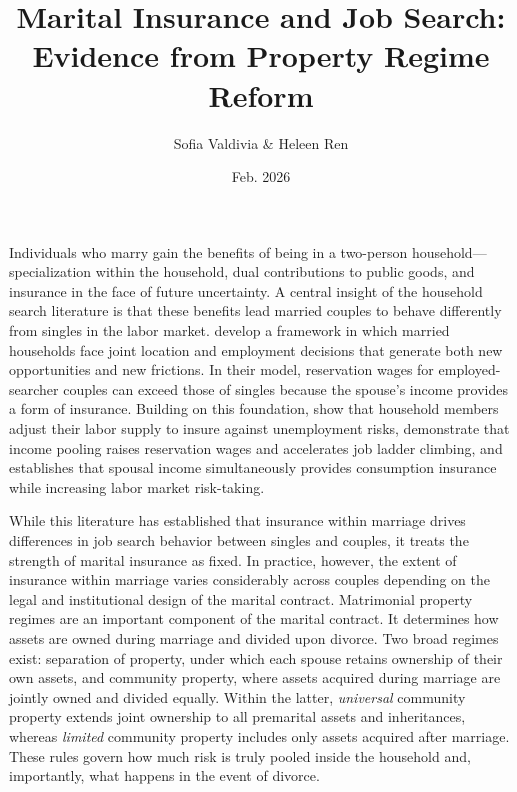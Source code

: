 \documentclass[11pt]{article}
\title{Marital Insurance and Job Search: Evidence from Property Regime Reform}
\author{Sofia Valdivia \& Heleen Ren}
\date{Feb. 2026}
\begin{document}
\maketitle

Individuals who marry gain the benefits of being in a two-person household—specialization within the household, dual contributions to public goods, and insurance in the face of future uncertainty. A central insight of the
household search literature is that these benefits lead married couples to behave differently from singles in the labor market. \cite{GULER2012352} develop a framework in which married households face joint location and employment decisions that generate both new opportunities and new frictions. In their model, reservation wages for employed-searcher couples can exceed those of singles because the spouse’s income provides a form of insurance. Building on this foundation, \cite{mankart2017household} show that household members adjust their labor supply to insure against unemployment risks, \cite{pilossoph_wee} demonstrate that income pooling raises reservation wages and accelerates job ladder climbing, and \cite{FERNANDEZBLANCO2022105477} establishes that spousal income simultaneously provides consumption insurance while increasing labor market risk-taking.

While this literature has established that insurance within marriage drives differences in job search behavior between singles and couples, it treats the strength of marital insurance as fixed. In practice, however, the extent of insurance within marriage varies considerably across couples depending on the legal and institutional design of the marital contract. Matrimonial property regimes are an important component of the marital contract. It determines how assets are owned during marriage and divided upon divorce. Two broad regimes exist: separation of property, under which each spouse retains ownership of their own assets, and community property, where assets acquired during marriage are jointly owned and divided equally. Within the latter, \textit{universal} community property extends joint ownership to all premarital assets and inheritances, whereas \textit{limited} community property includes only assets acquired after marriage. These rules govern how much risk is truly pooled inside the household and, importantly, what happens in the event of divorce.
\end{document}
